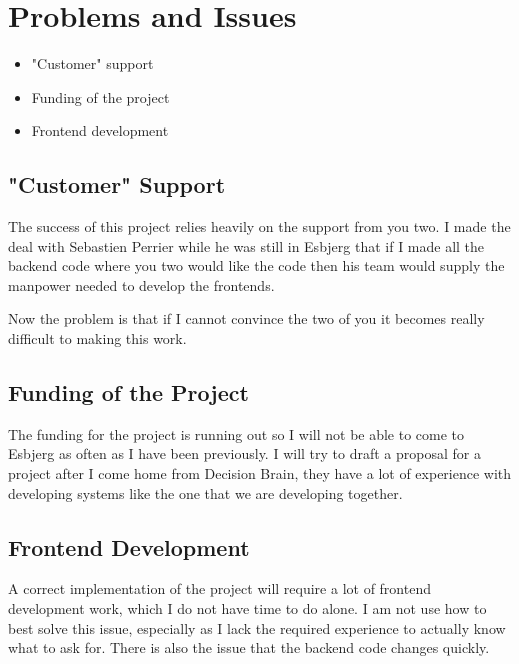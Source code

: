 \section{Problems and Issues}


\begin{itemize}
	\item "Customer" support
	\item Funding of the project 
	\item Frontend development
\end{itemize}

\subsection{"Customer" Support}
The success of this project relies heavily on the support from you two. I
made the deal with Sebastien Perrier while he was still in Esbjerg that
if I made all the backend code where you two would like the code then his
team would supply the manpower needed to develop the frontends. 

Now the problem is that if I cannot convince the two of you it becomes 
really difficult to making this work. 

\subsection{Funding of the Project}
The funding for the project is running out so I will not be able to 
come to Esbjerg as often as I have been previously. I will try to 
draft a proposal for a project after I come home from Decision Brain,
they have a lot of experience with developing systems like the one that
we are developing together. 

\subsection{Frontend Development}
A correct implementation of the project will require a lot of frontend 
development work, which I do not have time to do alone. I am not use 
how to best solve this issue, especially as I lack the required 
experience to actually know what to ask for. There is also the 
issue that the backend code changes quickly. 
